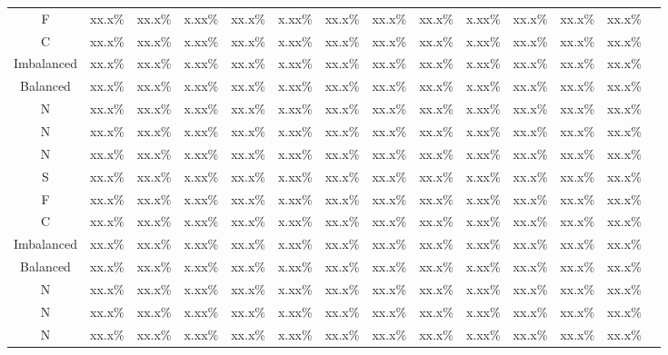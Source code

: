 \documentclass[journal]{IEEEtran}
\begin{document}
\begin{table}[!htbp]
\begin{center}
\begin{threeparttable}
\begin{tabular}{cccccccccccccc}
 F & xx.x\% &  xx.x\%  &  x.xx\%   & xx.x\%    &  x.xx\%  & xx.x\%& xx.x\% &xx.x\%&  x.xx\%& xx.x\%&xx.x\%&xx.x\% \\
 C & xx.x\% &  xx.x\%  &  x.xx\%   & xx.x\%    &  x.xx\%  & xx.x\%& xx.x\% &xx.x\%&  x.xx\%& xx.x\%&xx.x\%&xx.x\% \\
 Imbalanced & xx.x\% &  xx.x\%  &  x.xx\%   & xx.x\%    &  x.xx\%  & xx.x\%& xx.x\% &xx.x\%&  x.xx\%& xx.x\%&xx.x\%&xx.x\% \\
  Balanced & xx.x\% &  xx.x\%  &  x.xx\%   & xx.x\%    &  x.xx\%  & xx.x\%& xx.x\% &xx.x\%&  x.xx\%& xx.x\%&xx.x\%&xx.x\% \\
        N & xx.x\% &  xx.x\%  &  x.xx\%   & xx.x\%    &  x.xx\%  & xx.x\%& xx.x\% &xx.x\%&  x.xx\%& xx.x\%&xx.x\%&xx.x\% \\
         N & xx.x\% &  xx.x\%  &  x.xx\%   & xx.x\%    &  x.xx\%  & xx.x\%& xx.x\% &xx.x\%&  x.xx\%& xx.x\%&xx.x\%&xx.x\% \\
          N & xx.x\% &  xx.x\%  &  x.xx\%   & xx.x\%    &  x.xx\%  & xx.x\%& xx.x\% &xx.x\%&  x.xx\%& xx.x\%&xx.x\%&xx.x\% \\
          S & xx.x\% &  xx.x\%  &  x.xx\%   & xx.x\%    &  x.xx\%  & xx.x\%& xx.x\% &xx.x\%&  x.xx\%& xx.x\%&xx.x\%&xx.x\% \\
 F & xx.x\% &  xx.x\%  &  x.xx\%   & xx.x\%    &  x.xx\%  & xx.x\%& xx.x\% &xx.x\%&  x.xx\%& xx.x\%&xx.x\%&xx.x\% \\
 C & xx.x\% &  xx.x\%  &  x.xx\%   & xx.x\%    &  x.xx\%  & xx.x\%& xx.x\% &xx.x\%&  x.xx\%& xx.x\%&xx.x\%&xx.x\% \\
 Imbalanced & xx.x\% &  xx.x\%  &  x.xx\%   & xx.x\%    &  x.xx\%  & xx.x\%& xx.x\% &xx.x\%&  x.xx\%& xx.x\%&xx.x\%&xx.x\% \\
  Balanced & xx.x\% &  xx.x\%  &  x.xx\%   & xx.x\%    &  x.xx\%  & xx.x\%& xx.x\% &xx.x\%&  x.xx\%& xx.x\%&xx.x\%&xx.x\% \\
        N & xx.x\% &  xx.x\%  &  x.xx\%   & xx.x\%    &  x.xx\%  & xx.x\%& xx.x\% &xx.x\%&  x.xx\%& xx.x\%&xx.x\%&xx.x\% \\
         N & xx.x\% &  xx.x\%  &  x.xx\%   & xx.x\%    &  x.xx\%  & xx.x\%& xx.x\% &xx.x\%&  x.xx\%& xx.x\%&xx.x\%&xx.x\% \\
          N & xx.x\% &  xx.x\%  &  x.xx\%   & xx.x\%    &  x.xx\%  & xx.x\%& xx.x\% &xx.x\%&  x.xx\%& xx.x\%&xx.x\%&xx.x\% \\
          \hline
\end{tabular}
\end{threeparttable}
\end{center}
\end{table}
\end{document}
